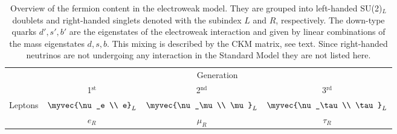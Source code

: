 

\begin{table}
  \caption[Overview of the fermion content in the electroweak model.]{Overview of the fermion content in the electroweak model. They are grouped into left-handed SU(2)$_L$ doublets and right-handed singlets denoted with the subindex $L$ and $R$, respectively. The down-type quarks $d', s', b'$ are the eigenstates of the electroweak interaction and given by linear combinations of the mass eigenstates $d, s, b$. This mixing is described by the CKM matrix, see text. Since right-handed neutrinos are not undergoing any interaction in the Standard Model they are not listed here.}
  \label{tab:ewfermioncontent}
  \centering
  \begin{tabular}{c |@{}| c c c }
    \toprule
                             & \multicolumn{3}{c}{Generation}                                                                       \\
                             & 1$^{\text{st}}$                & 2$^{\text{nd}}$                     & 3$^{\text{rd}}$        \\
    \midrule
    \multirow{3}{*}{Leptons} & \multirow{2}{*}{$\myvec{\nu_e                                                                                                             \\ e}_L$} & \multirow{2}{*}{$\myvec{\nu_\mu \\ \mu}_L$} & \multirow{2}{*}{$\myvec{\nu_\tau \\ \tau}_L$}  \\
                             &                                &                                     &                            \\
                             & $e_R$                          & $\mu_R$                             & $\tau_R$           \\

\end{tabular}
\end{table}
